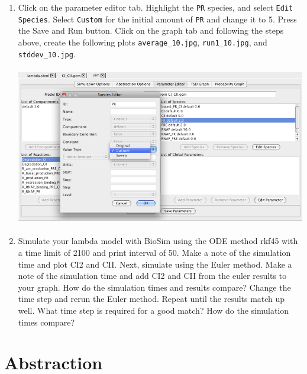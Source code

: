 \documentclass[titlepage,11pt]{article}
\begin{document}
\begin{enumerate}
\item Click on the parameter editor tab.  Highlight the {\tt PR} 
      species, and select {\tt Edit Species}.  Select {\tt Custom} for
      the initial amount of {\tt PR} and change it to 5.  Press the 
      Save and Run button.
      Click on the graph tab and following the steps above, create the 
      following plots {\tt average\_10.jpg},  {\tt run1\_10.jpg}, and
      {\tt stddev\_10.jpg}.  

\includegraphics[height=70mm]{screenshots/paramEdit}

\item Simulate your lambda model with BioSim using the ODE method rkf45 with
      a time limit of 2100 and print interval of 50.
      Make a note of the simulation time and plot CI2 and CII.  
      Next, simulate using the Euler method.  Make a note of the simulation time
      and add CI2 and CII from the euler results to your graph.  
      How do the simulation times and results compare?
      Change the time step and rerun the Euler method.  Repeat until the results
      match up well.  What time step is required for a good match?
      How do the simulation times compare?
\end{enumerate}

\section{Abstraction}
\end{document}
